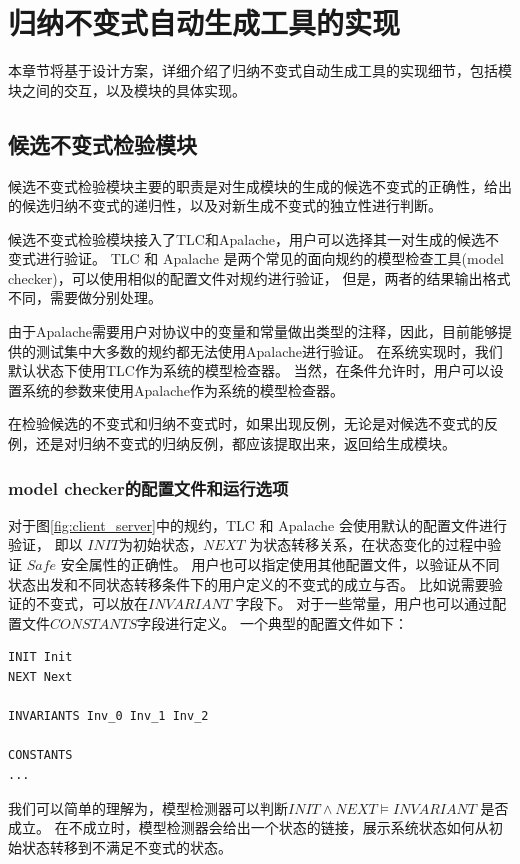 \chapter{归纳不变式自动生成工具的实现}\label{chap:implementation}

本章节将基于设计方案，详细介绍了归纳不变式自动生成工具的实现细节，包括模块之间的交互，以及模块的具体实现。

\section{候选不变式检验模块}

候选不变式检验模块主要的职责是对生成模块的生成的候选不变式的正确性，给出的候选归纳不变式的递归性，以及对新生成不变式的独立性进行判断。

候选不变式检验模块接入了TLC和Apalache，用户可以选择其一对生成的候选不变式进行验证。
TLC 和 Apalache 是两个常见的面向\TLA 规约的模型检查工具(model checker)，可以使用相似的配置文件对规约进行验证，
但是，两者的结果输出格式不同，需要做分别处理。

由于Apalache需要用户对协议中的变量和常量做出类型的注释，因此，目前能够提供的测试集中大多数的规约都无法使用Apalache进行验证。
在系统实现时，我们默认状态下使用TLC作为系统的模型检查器。
当然，在条件允许时，用户可以设置系统的参数来使用Apalache作为系统的模型检查器。

在检验候选的不变式和归纳不变式时，如果出现反例，无论是对候选不变式的反例，还是对归纳不变式的归纳反例，都应该提取出来，返回给生成模块。

\subsection{model checker的配置文件和运行选项}

对于图\ref{fig:client_server}中的规约，TLC 和 Apalache 会使用默认的配置文件进行验证，
即以 $INIT$为初始状态，$NEXT$ 为状态转移关系，在状态变化的过程中验证 $Safe$ 安全属性的正确性。
用户也可以指定使用其他配置文件，以验证从不同状态出发和不同状态转移条件下的用户定义的不变式的成立与否。
比如说需要验证的不变式，可以放在$INVARIANT$ 字段下。
对于一些常量，用户也可以通过配置文件$CONSTANTS$字段进行定义。
一个典型的配置文件如下：
\begin{lstlisting}
INIT Init
NEXT Next

INVARIANTS Inv_0 Inv_1 Inv_2

CONSTANTS
...
\end{lstlisting}
我们可以简单的理解为，模型检测器可以判断$INIT \wedge NEXT \vDash INVARIANT$ 是否成立。
在不成立时，模型检测器会给出一个状态的链接，展示系统状态如何从初始状态转移到不满足不变式的状态。

